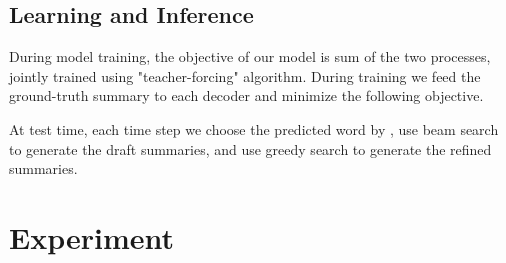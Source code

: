 \documentclass{article}
\begin{document}
\subsection{Learning and Inference}

During model training, the objective of our model is sum of the two processes, jointly trained using "teacher-forcing" algorithm. During training we feed the ground-truth summary to each decoder and minimize the following objective.



At test time, each time step we choose the predicted word by , use beam search to generate the draft summaries, and use greedy search to generate the refined summaries.

\section{Experiment}
\end{document}
